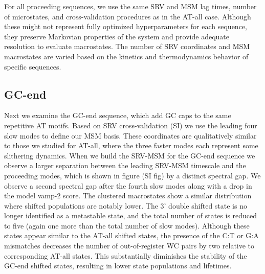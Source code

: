 \documentclass[journal=jpcbfk,manuscript=article]{achemso}
\begin{document}
For all proceeding sequences, we use the same SRV and MSM lag times, number of microstates, and cross-validation procedures as in the AT-all case. Although these might not represent fully optimized hyperparameters for each sequence, they preserve Markovian properties of the system and provide adequate resolution to evaluate macrostates. The number of SRV coordinates and MSM macrostates are varied based on the kinetics and thermodynamics behavior of specific sequences.


\subsection{\label{sec:Results}GC-end}
	
Next we examine the GC-end sequence, which add GC caps to the same repetitive AT motifs. Based on SRV cross-validation (SI) we use the leading four slow modes to define our MSM basis.  These coordinates are qualitatively similar to those we studied for AT-all, where the three faster modes each represent some slithering dynamics. When we build the SRV-MSM for the GC-end sequence we observe a larger separation between the leading SRV-MSM timescale and the proceeding modes, which is shown in figure (SI fig) by a distinct spectral gap. We observe a second spectral gap after the fourth slow modes along with a drop in the model vamp-2 score. The clustered macrostates show a similar distribution where shifted populations are notably lower. The 3' double shifted state is no longer identified as a metastable state, and the total number of states is reduced to five (again one more than the total number of slow modes). Although these states appear similar to the AT-all shifted states, the presence of the C:T or G:A mismatches decreases the number of out-of-register WC pairs by two relative to corresponding AT-all states. This substantially diminishes the stability of the GC-end shifted states, resulting in lower state populations and lifetimes.
\end{document}
